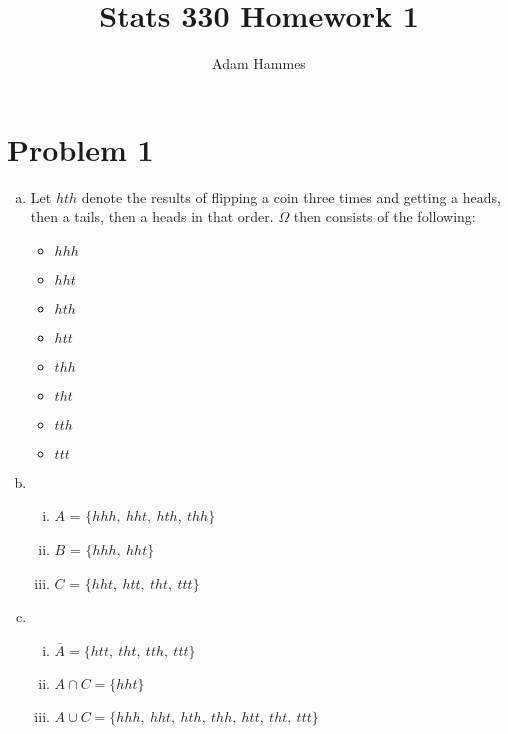 \documentclass[11pt]{article}
\begin{document}
\author{Adam Hammes}
\title{Stats 330 Homework 1}
\maketitle

\section*{Problem 1}
	\begin{enumerate}[(a)]
	\item
		Let $hth$ denote the results of flipping a coin three times and getting a heads, then a tails, then a heads in that order. $\Omega$ then consists of the following:	
		\begin{itemize}
			\item $hhh$
			\item $hht$
			\item $hth$
			\item $htt$
			\item $thh$
			\item $tht$
			\item $tth$
			\item $ttt$
		\end{itemize}
	
	\item 
		\begin{enumerate}[i.]
			\item $A$ = $\{ hhh,\ hht,\ hth,\ thh\}$
			\item $B$ = $\{ hhh,\ hht \}$
			\item $C$ = $\{ hht,\ htt,\ tht,\ ttt\}$
		\end{enumerate}
		
	\item
		\begin{enumerate}[i.]
			\item $\overline{A} = \{htt,\ tht,\ tth,\ ttt\} $
			\item $ A \cap C = \{ hht \} $
			\item $ A \cup C = \{ hhh,\ hht,\ hth,\ thh,\ htt,\ tht,\ ttt\}$

		\end{enumerate}
	\end{enumerate}
\end{document}
